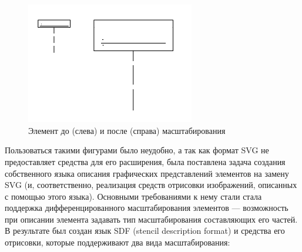 \documentclass[a5paper]{article}
\begin{document}
\begin{figure} [ht]
  \begin{center}
    \includegraphics[width=7.35cm,height=5.295cm]{draft04-img3.jpg}
    \caption{Элемент до (слева) и после (справа) масштабирования}
    \label{scaling}
  \end{center}
\end{figure}

%

Пользоваться такими фигурами было неудобно, а так как формат
SVG не предоставляет средства для его
расширения, была поставлена задача создания собственного языка описания
графических представлений элементов на замену SVG (и, соответственно,
реализация средств отрисовки изображений, описанных с помощью этого
языка). Основными требованиями к нему стали стала поддержка
дифференцированного масштабирования элементов --- возможность при
описании элемента задавать тип масштабирования составляющих его частей.
В результате был создан язык SDF (stencil description format) и
средства его отрисовки, которые поддерживают два вида масштабирования:
\end{document}
